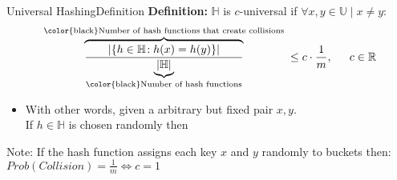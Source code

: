 
\begin{frame}{Universal Hashing}{Definition}
  \textbf{Definition:}
  {\color{MainA}$\mathbb{H}$} is {\color{MainA}$c$-universal} if
  {\color{MainA}$\forall x, y \in \mathbb{U} \mid x \neq y:$
  \begin{displaymath}
    \overbrace{
      \frac{
        \vert \{h \in \mathbb{H}\!: h(x) = h(y)\} \vert
      }{
      \underbrace{\vert \mathbb{H} \vert}_\text{{\color{black}Number of hash functions}}
      }
    }^\text{
      {\color{black}Number of hash functions that create collisions}
    }
    \leq c \cdot \frac{1}{m}, \hspace*{1.5em} c \in \mathbb{R}
  \end{displaymath}}
  \vspace{-1em}
  \begin{itemize}
  \item<2->
      With other words, given a arbitrary but fixed pair
      {\color{MainA}$x, y$}.\\
      If {\color{MainA}$h \in \mathbb{H}$} is chosen randomly then\\
  \end{itemize}
  \begin{block}{Note: If the hash function assigns each key $x$ and $y$
      randomly to buckets then:}
    {$Prob( Collision ) = \frac{1}{m} \Leftrightarrow c = 1$}
  \end{block}
\end{frame}


